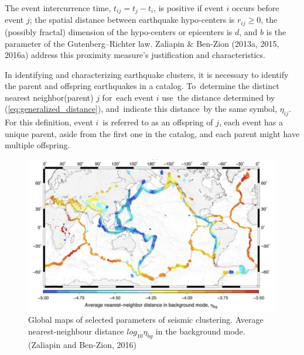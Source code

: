 \documentclass[12pt]{article} %
\theoremstyle{plain}
\begin{document}
	\noindent The event intercurrence time, $t_{ij}=t_{j}-t_{i}$, is positive if event $i$ occurs before event $j$; the spatial distance between earthquake hypo-centers is $r_{ij}\geq0$, the (possibly fractal) dimension of the hypo-centers or epicenters is $d$, and $b$ is the parameter of the Gutenberg–Richter law. Zaliapin $\&$ Ben-Zion (2013a, 2015, 2016a) address this proximity measure's justification and characteristics. 
	
	
	In identifying and characterizing earthquake clusters, it is necessary to identify the parent and offspring earthquakes in a catalog. To determine the distinct nearest neighbor(parent) $j$ for each event $i$ use the distance determined by (\ref{eq:generalized_distance}), and indicate this distance by the same symbol, $\eta_{ij}$. For this definition, event $i$ is referred to as an offspring of $j$, each event has a unique parent, aside from the first one in the catalog, and each parent might have multiple offspring.  
	
	\begin{figure}
		\centering
		\includegraphics[width=0.9\linewidth]{Thesis_Figures,Images,Tables/average_nearest_neighbor_distance}
		\caption[Global maps of selected parameters of seismic clustering.]{Global maps of selected parameters of seismic clustering. Average nearest-neighbour distance $log_{10}\eta_{bg}$ in the background mode. (Zaliapin and Ben-Zion, 2016)}
		\label{fig:averagenearestneighbordistance}
	\end{figure}
	
\end{document}
